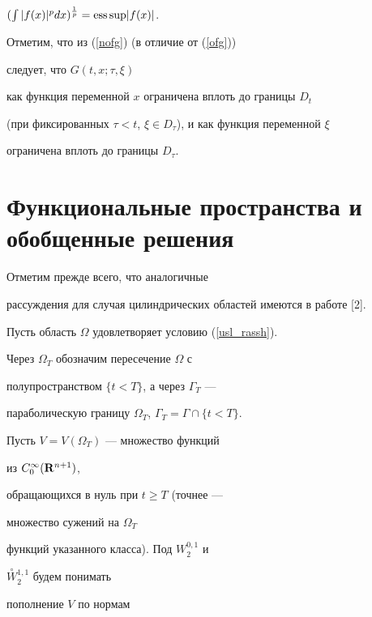 $(\int|f(x)|^p dx)^{\frac{1}{p}}=\text{ess\,sup}|f(x)|$. 


\medskip





Отметим, что из (\ref{nofg}) (в отличие от (\ref{ofg}))


следует, что $G(t,x;\tau,\xi)$


как функция переменной $x$ ограничена вплоть до границы $D_t$ 


(при фиксированных $\tau<t$, $\xi\in D_\tau$), и как функция переменной $\xi$


ограничена вплоть до границы $D_\tau$.





\section{Функциональные пространства и обобщенные решения}


 


Отметим прежде всего, что аналогичные


рассуждения для случая цилиндрических областей имеются в работе [2].





Пусть область $\Omega$ удовлетворяет условию (\ref{usl_rassh}). 


Через $\Omega_T$ обозначим пересечение $\Omega$ с


полупространством $\{ t<T \}$, а через $\Gamma_T$ --- 


параболическую границу $\Omega_T$, $\Gamma_T=\Gamma\cap\{ t<T\}$.





Пусть $V=V(\Omega_T)$ --- множество функций 


из $C_0^\infty({\bold R}^{n+1})$,


обращающихся в нуль при $t \geq T$ (точнее --- 


множество сужений на $\Omega_T$


функций указанного класса). Под $W_2^{0,1}$ и


$\overset{\circ}{W}{}_2^{1,1}$ будем понимать


пополнение $V$ по нормам


